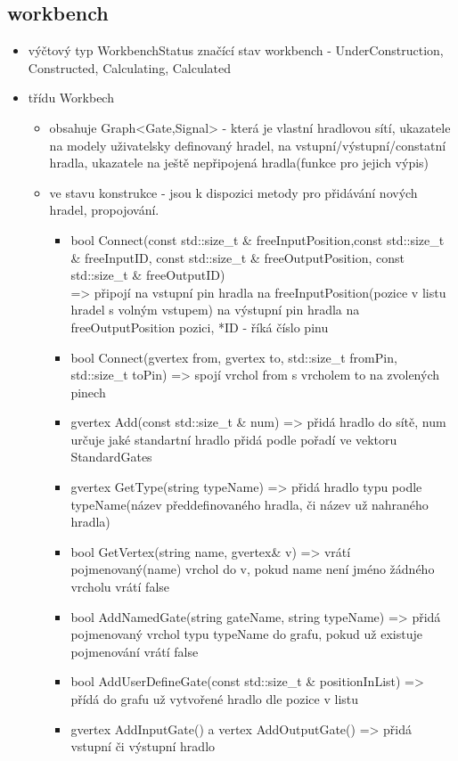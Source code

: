 \documentclass[12pt, oneside]{article}
\begin{document}
\subsection*{workbench}
\begin{itemize}
\item výčtový typ WorkbenchStatus značící stav workbench  -  UnderConstruction, Constructed, Calculating, Calculated
\item třídu Workbech
\begin{itemize} 
\item obsahuje Graph<Gate,Signal> - která je vlastní hradlovou sítí, ukazatele na modely uživatelsky definovaný hradel, na vstupní/výstupní/constatní hradla, ukazatele na ještě nepřipojená hradla(funkce pro  jejich výpis) 
\item ve stavu konstrukce - jsou k dispozici metody pro přidávání  nových hradel, propojování.
\begin{itemize}
\item  bool Connect(const std::size\_t \& freeInputPosition,const std::size\_t \& freeInputID, const std::size\_t \& freeOutputPosition, const std::size\_t \& freeOutputID)\\ => připojí na vstupní pin hradla na freeInputPosition(pozice v listu hradel s volným vstupem) na výstupní pin hradla na freeOutputPosition pozici, *ID - říká číslo pinu 
\item bool Connect(gvertex from, gvertex to, std::size\_t fromPin, std::size\_t toPin) => spojí vrchol from s vrcholem to na zvolených pinech
\item gvertex Add(const std::size\_t \& num) => přidá hradlo do sítě, num určuje jaké standartní hradlo přidá podle pořadí ve vektoru StandardGates 
\item gvertex GetType(string typeName) => přidá hradlo typu podle typeName(název předdefinovaného hradla, či název už nahraného hradla) 
\item bool GetVertex(string name, gvertex\& v)  => vrátí pojmenovaný(name) vrchol do v, pokud name není jméno žádného vrcholu vrátí false
\item bool AddNamedGate(string gateName, string typeName) => přidá pojmenovaný vrchol  typu typeName do grafu, pokud už existuje pojmenování vrátí false
\item bool AddUserDefineGate(const std::size\_t \& positionInList) => přídá do grafu už vytvořené hradlo dle pozice v listu 
\item 	gvertex AddInputGate()  a vertex AddOutputGate() =>  přidá vstupní či výstupní hradlo 

\end{itemize}
\end{itemize}
\end{itemize}
\end{document}
